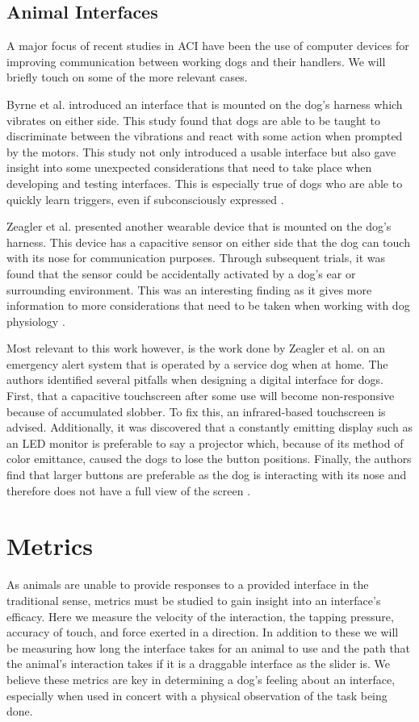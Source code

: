 \documentclass{sigchi}
\begin{document}
    \subsection{Animal Interfaces}
        A major focus of recent studies in ACI have been the use of computer devices for improving communication between working dogs and their handlers. We will briefly touch on some of the more relevant cases.
        
        Byrne et al. introduced an interface that is mounted on the dog’s harness which vibrates on either side. This study found that dogs are able to be taught to discriminate between the vibrations and react with some action when prompted by the motors. This study not only introduced a usable interface but also gave insight into some unexpected considerations that need to take place when developing and testing interfaces. This is especially true of dogs who are able to quickly learn triggers, even if subconsciously expressed \cite{Byrne2014}.
        
        Zeagler et al. presented another wearable device that is mounted on the dog’s harness. This device has a capacitive sensor on either side that the dog can touch with its nose for communication purposes. Through subsequent trials, it was found that the sensor could be accidentally activated by a dog’s ear or surrounding environment. This was an interesting finding as it gives more information to more considerations that need to be taken when working with dog physiology \cite{Zeagler2016a}.
        
        Most relevant to this work however, is the work done by Zeagler et al. on an emergency alert system that is operated by a service dog when at home. The authors identified several pitfalls when designing a digital interface for dogs. First, that a capacitive touchscreen after some use will become non-responsive because of accumulated slobber. To fix this, an infrared-based touchscreen is advised. Additionally, it was discovered that a constantly emitting display such as an LED monitor is preferable to say a projector which, because of its method of color emittance, caused the dogs to lose the button positions. Finally, the authors find that larger buttons are preferable as the dog is interacting with its nose and therefore does not have a full view of the screen \cite{Zeagler2014}.

    \section{Metrics}
        As animals are unable to provide responses to a provided interface in the traditional sense, metrics must be studied to gain insight into an interface’s efficacy. Here we measure the velocity of the interaction, the tapping pressure, accuracy of touch, and force exerted in a direction. In addition to these we will be measuring how long the interface takes for an animal to use and the path that the animal’s interaction takes if it is a draggable interface as the slider is. We believe these metrics are key in determining a dog’s feeling about an interface, especially when used in concert with a physical observation of the task being done.
\end{document}
